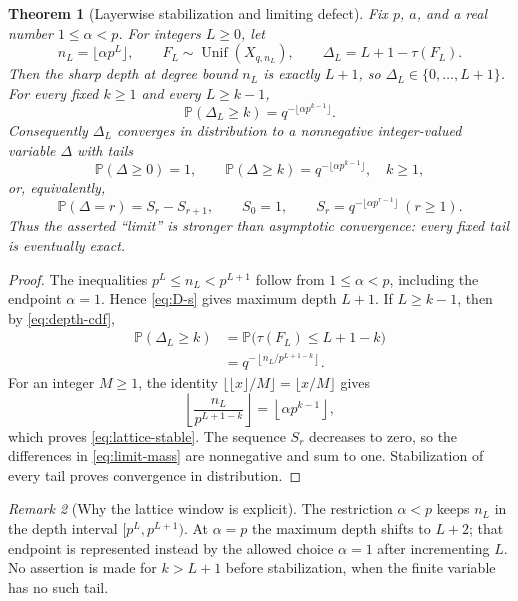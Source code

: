 \documentclass[10pt,a4paper]{amsart}
\newtheorem{theorem}{Theorem}[section]
\theoremstyle{definition}
\theoremstyle{remark}
\newtheorem{remark}[theorem]{Remark}
\newcommand{\Prob}{\mathbb P}
\begin{document}
\begin{theorem}[Layerwise stabilization and limiting defect]
\label{thm:lattice}
Fix $p$, $a$, and a real number $1\le\alpha<p$.  For integers $L\ge0$, let
\[
 n_L=\lfloor\alpha p^L\rfloor,
 \qquad F_L\sim\operatorname{Unif}(X_{q,n_L}),
 \qquad \Delta_L=L+1-\tau(F_L).
\]
Then the sharp depth at degree bound $n_L$ is exactly $L+1$, so
$\Delta_L\in\{0,\ldots,L+1\}$.  For every fixed $k\ge1$ and every
$L\ge k-1$,
\begin{equation}
 \boxed{\quad
 \Prob(\Delta_L\ge k)
 =q^{-\lfloor\alpha p^{k-1}\rfloor}.
 \quad}
 \label{eq:lattice-stable}
\end{equation}
Consequently $\Delta_L$ converges in distribution to a nonnegative
integer-valued variable $\Delta$ with tails
\begin{equation}
 \Prob(\Delta\ge0)=1,
 \qquad
 \Prob(\Delta\ge k)=q^{-\lfloor\alpha p^{k-1}\rfloor},\quad k\ge1,
 \label{eq:limit-tail}
\end{equation}
or, equivalently,
\begin{equation}
 \Prob(\Delta=r)=S_r-S_{r+1},\qquad
 S_0=1,\qquad S_r=q^{-\lfloor\alpha p^{r-1}\rfloor}\ (r\ge1).
 \label{eq:limit-mass}
\end{equation}
Thus the asserted ``limit'' is stronger than asymptotic convergence:
every fixed tail is eventually exact.
\end{theorem}

\begin{proof}
The inequalities
$p^L\le n_L<p^{L+1}$ follow from $1\le\alpha<p$, including the endpoint
$\alpha=1$.  Hence \eqref{eq:D-s} gives maximum depth $L+1$.  If
$L\ge k-1$, then by \eqref{eq:depth-cdf},
\begin{align*}
 \Prob(\Delta_L\ge k)
 &=\Prob\bigl(\tau(F_L)\le L+1-k\bigr)\\
 &=q^{-\left\lfloor n_L/p^{L+1-k}\right\rfloor}.
\end{align*}
For an integer $M\ge1$, the identity
$\lfloor\lfloor x\rfloor/M\rfloor=\lfloor x/M\rfloor$ gives
\[
 \left\lfloor\frac{n_L}{p^{L+1-k}}\right\rfloor
 =\left\lfloor\alpha p^{k-1}\right\rfloor,
\]
which proves \eqref{eq:lattice-stable}.  The sequence $S_r$ decreases to
zero, so the differences in \eqref{eq:limit-mass} are nonnegative and
sum to one.  Stabilization of every tail proves convergence in distribution.
\end{proof}

\begin{remark}[Why the lattice window is explicit]
The restriction $\alpha<p$ keeps $n_L$ in the depth interval
$[p^L,p^{L+1})$.  At $\alpha=p$ the maximum depth shifts to $L+2$; that
endpoint is represented instead by the allowed choice $\alpha=1$ after
incrementing $L$.  No assertion is made for $k>L+1$ before stabilization,
when the finite variable has no such tail.
\end{remark}
\end{document}
